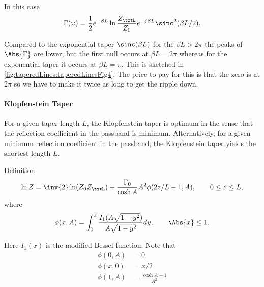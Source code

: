 In this case
\begin{equation}\label{eqn:continuumAndOtherTransformersCore:1000}
\Gamma(\omega) = \frac{1}{2} e^{-\beta L} \ln \frac{Z_\txtL}{Z_0} e^{-j \beta L} \sinc^2( \beta L/2 ).
\end{equation}

Compared to the exponential taper \( \sinc( \beta L ) \) for the \( \beta L > 2 \pi \) the peaks of \( \Abs{\Gamma} \) are lower, but the first null occurs at \( \beta L = 2 \pi \) whereas for the exponential taper it occurs at \( \beta L = \pi \).  This is sketched in \cref{fig:taperedLines:taperedLinesFig4}.  The price to pay for this is that the zero is at \( 2 \pi \) so we have to make it twice as long to get the ripple down.

\paragraph{Klopfenstein Taper}
For a given taper length \( L \), the Klopfenstein taper is optimum in the sense that the reflection coefficient in the passband is minimum.  Alternatively, for a given minimum reflection coefficient in the passband, the Klopfenstein taper yields the shortest length \( L \).

Definition:
\begin{equation}\label{eqn:continuumAndOtherTransformersCore:1020}
\ln Z = \inv{2} \ln (Z_0 Z_\txtL) + \frac{\Gamma_0}{\cosh A} A^2 \phi(2 z/L -1, A), \qquad 0 \le z \le L,
\end{equation}
where
\begin{equation}\label{eqn:continuumAndOtherTransformersCore:1040}
\phi(x, A) = \int_0^x \frac{I_1(A\sqrt{1 - y^2})}{A \sqrt{1 - y^2}} dy, \qquad \Abs{x} \le 1.
\end{equation}

Here \( I_1(x) \) is the modified Bessel function.  Note that
\begin{equation}\label{eqn:continuumAndOtherTransformersCore:1060}
\begin{aligned}
\phi(0, A) &= 0 \\
\phi(x, 0) &= x/2 \\
\phi(1, A) &= \frac{\cosh A - 1}{A^2}
\end{aligned}
\end{equation}

